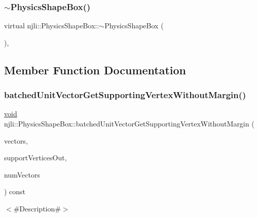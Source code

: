 \subsubsection{\texorpdfstring{$\sim$\+Physics\+Shape\+Box()}{~PhysicsShapeBox()}}
{\footnotesize\ttfamily virtual njli\+::\+Physics\+Shape\+Box\+::$\sim$\+Physics\+Shape\+Box (\begin{DoxyParamCaption}{ }\end{DoxyParamCaption})\hspace{0.3cm}{\ttfamily [protected]}, {\ttfamily [virtual]}}



\subsection{Member Function Documentation}
\mbox{\label{classnjli_1_1_physics_shape_box_a99378d684de6e94bc490521804eebb5d}} 
\subsubsection{\texorpdfstring{batched\+Unit\+Vector\+Get\+Supporting\+Vertex\+Without\+Margin()}{batchedUnitVectorGetSupportingVertexWithoutMargin()}}
{\footnotesize\ttfamily \mbox{\hyperlink{_thread_8h_af1e856da2e658414cb2456cb6f7ebc66}{void}} njli\+::\+Physics\+Shape\+Box\+::batched\+Unit\+Vector\+Get\+Supporting\+Vertex\+Without\+Margin (\begin{DoxyParamCaption}\item[{const bt\+Vector3 $\ast$}]{vectors,  }\item[{bt\+Vector3 $\ast$}]{support\+Vertices\+Out,  }\item[{int}]{num\+Vectors }\end{DoxyParamCaption}) const}

$<$\#\+Description\#$>$


